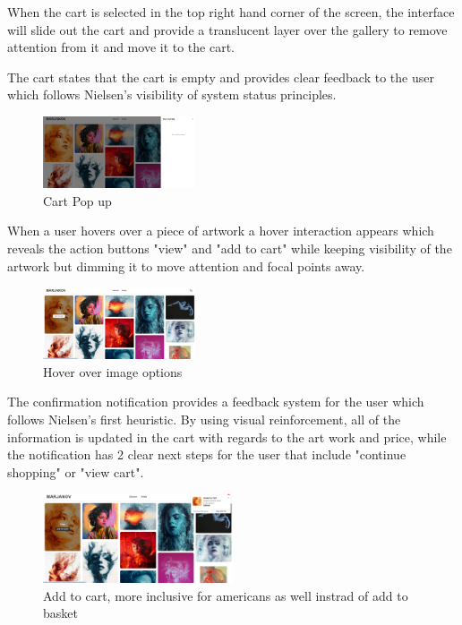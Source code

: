 \documentclass[]{project_final}
\begin{document}
When the cart is selected in the top right hand corner of the screen, the interface will slide out the cart and provide a translucent layer over the gallery to remove attention from it and move it to the cart.

The cart states that the cart is empty and provides clear feedback to the user which follows Nielsen's visibility of system status principles.

\begin{figure}[ht!]
  \centering
  \includegraphics[width=0.4\textwidth]{AG2.png}
  \vspace*{0.0cm}
  \caption{Cart Pop up}
  \label{fig:1}
\end{figure}

When a user hovers over a piece of artwork a hover interaction appears which reveals the action buttons "view" and "add to cart" while keeping visibility of the artwork but dimming it to move attention and focal points away.

\begin{figure}[ht!]
  \centering
  \includegraphics[width=0.4\textwidth]{AG3.png}
  \vspace*{0.0cm}
  \caption{Hover over image options}
  \label{fig:1}
\end{figure}

The confirmation notification provides a feedback system for the user which follows Nielsen's first heuristic. By using visual reinforcement, all of the information is updated in the cart  with regards to the art work and price, while the notification has 2 clear next steps for the user that include "continue shopping" or "view cart".

\begin{figure}[ht!]
  \centering
  \includegraphics[width=0.5\textwidth]{AG4.png}
  \vspace*{0.0cm}
  \caption{Add to cart, more inclusive for americans as well instrad of add to basket}
  \label{fig:1}
\end{figure}
\end{document}
